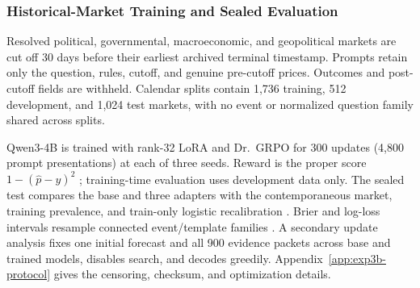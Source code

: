 \subsubsection{Historical-Market Training and Sealed Evaluation}
\label{sec:methods-exp4-polymarket}

Resolved political, governmental, macroeconomic, and geopolitical markets are cut
off 30 days before their earliest archived terminal timestamp. Prompts retain only
the question, rules, cutoff, and genuine pre-cutoff prices. Outcomes and post-cutoff
fields are withheld. Calendar splits contain 1,736 training, 512 development, and
1,024 test markets, with no event or normalized question family shared across
splits.

Qwen3-4B \citep{qwen2025qwen3} is trained with rank-32 LoRA
\citep{hu2022lora} and Dr.~GRPO \citep{liu2025understanding} for 300 updates
(4,800 prompt presentations) at each of three seeds. Reward is the proper score
$1-(\hat p-y)^2$ \citep{brier1950verification}; training-time evaluation uses
development data only. The sealed test compares the base and three adapters with
the contemporaneous market, training prevalence, and train-only logistic recalibration
\citep{dawid1982well}. Brier and log-loss
intervals resample connected event/template families
\citep{brier1950verification,good1952rational}. A secondary update analysis fixes
one initial forecast and all 900 evidence packets across base and trained models,
disables search, and decodes greedily. Appendix~\ref{app:exp3b-protocol} gives the
censoring, checksum, and optimization details.
